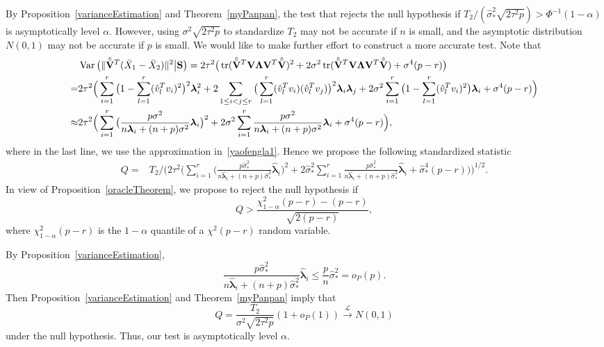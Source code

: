 \documentclass[3p]{elsarticle}
\DeclareMathOperator{\mytr}{tr}
\DeclareMathOperator{\myVar}{Var}
\newcommand{\bfsym}[1]{\ensuremath{\boldsymbol{#1}}}
\def\blambda {\bfsym {\lambda}}        \def\bLambda {\bfsym {\Lambda}}
\theoremstyle{plain}
\theoremstyle{definition}
\theoremstyle{remark}
\begin{document}
By Proposition~\ref{varianceEstimation} and Theorem~\ref{myPanpan}, the test that rejects the null hypothesis if
$
T_2/(\hat{\sigma}^2_*\sqrt{2\tau^2 p})>\Phi^{-1}(1-\alpha)
$
is asymptotically level $\alpha$.
However, using $\sigma^2\sqrt{2\tau^2 p}$ to standardize $T_2$ may not be accurate if $n$ is small, and the asymptotic distribution $N(0,1)$ may not be accurate if $p$ is small.
We would like to make further effort to construct a more accurate test.
Note that
$$
\begin{aligned}
    &\myVar\big(
\|\hat{\tilde{\BV}}^T (\bar{X}_1-\bar{X}_2)\|^2
\big| \BS
\big)
    =2\tau^2\big(
\mytr(\hat{\tilde{\BV}}^T \BV \bLambda \BV^T\hat{\tilde{\BV}})^2
+
2\sigma^2\mytr(\hat{\tilde{\BV}}^T \BV \bLambda \BV^T\hat{\tilde{\BV}})
+\sigma^4 (p-r)
\big)
\\
    =&
    2\tau^2\Big(
    \sum_{i=1}^r \big(1-\sum_{l=1}^r (\hat{v}_l^T v_i)^2\big)^2 \blambda_i^2
    +2\sum_{1\leq i<j \leq r}\big(\sum_{l=1}^r (\hat{v}_l^T v_i)(\hat{v}_l^T v_j )\big)^2\blambda_i\blambda_j
    +
    2\sigma^2\sum_{i=1}^r \big(1-\sum_{l=1}^r (\hat{v}_l^T v_i)^2\big) \blambda_i
    +\sigma^4 (p-r)
    \Big)
    \\
    \approx&
    2\tau^2\Big(
    \sum_{i=1}^r \big(\frac{p\sigma^2}{n\blambda_i+(n+p)\sigma^2}\blambda_i\big)^2
    +
    2\sigma^2\sum_{i=1}^r \frac{p\sigma^2}{n\blambda_i+(n+p)\sigma^2}\blambda_i
    +\sigma^4 (p-r)
    \Big),
\end{aligned}
$$
where in the last line, we use the approximation in~\eqref{yaofengla1}.
Hence we propose the following standardized statistic
$$
    \begin{aligned}
        Q=&T_2/
   \Bigg( 
        2\tau^2\Big(
        \sum_{i=1}^r \big(\frac{p\hat{\sigma}_*^2}{n\hat{\blambda}_i+(n+p)\hat{\sigma}_*^2}\hat{\blambda}_i\big)^2
    +
        2\hat{\sigma}_*^2\sum_{i=1}^r \frac{p\hat{\sigma}_*^2}{n\hat{\blambda}_i+(n+p)\hat{\sigma}_*^2}\hat{\blambda}_i
        +\hat{\sigma}_*^4 (p-r)
    \Big)\Bigg)^{1/2}.
    \end{aligned}
$$
In view of Proposition~\ref{oracleTheorem}, we propose to reject the null hypothesis if
$$
        Q>\frac{\chi^2_{1-\alpha}(p-r)-(p-r)}{\sqrt{2(p-r)}},
$$
where $\chi^2_{1-\alpha} (p-r)$ is the $1-\alpha$ quantile of a $\chi^2(p-r)$ random variable.

By Proposition~\ref{varianceEstimation},
$$
\frac{p\hat{\sigma}_*^2}{n\hat{\blambda}_i+(n+p)\hat{\sigma}_*^2}\hat{\blambda}_i\leq
\frac{p}{n}\hat{\sigma}_*^2
=o_P(p).
$$
Then Proposition~\ref{varianceEstimation} and Theorem~\ref{myPanpan} imply that
$$
Q=\frac{T_2}{\sigma^2\sqrt{2\tau^2 p}}(1+o_P(1))\xrightarrow{\mathcal{L}}N(0,1)
$$
under the null hypothesis.
Thus, our test is asymptotically level $\alpha$.
\end{document}
